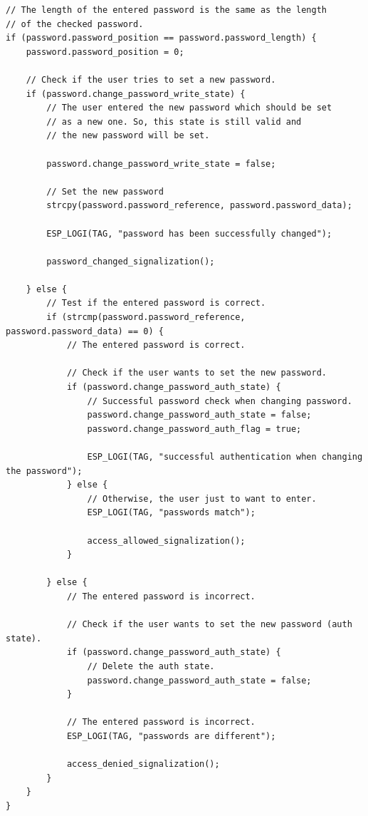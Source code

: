 \documentclass[a4paper, 12pt]{article}
\begin{document}
\begin{lstlisting}[style=CLanguage]
// The length of the entered password is the same as the length
// of the checked password.
if (password.password_position == password.password_length) {
    password.password_position = 0;

    // Check if the user tries to set a new password. 
    if (password.change_password_write_state) {
        // The user entered the new password which should be set
        // as a new one. So, this state is still valid and
        // the new password will be set.
        
        password.change_password_write_state = false;

        // Set the new password
        strcpy(password.password_reference, password.password_data);

        ESP_LOGI(TAG, "password has been successfully changed");

        password_changed_signalization();

    } else {
        // Test if the entered password is correct.
        if (strcmp(password.password_reference, password.password_data) == 0) {
            // The entered password is correct.

            // Check if the user wants to set the new password.
            if (password.change_password_auth_state) {                            
                // Successful password check when changing password.
                password.change_password_auth_state = false;
                password.change_password_auth_flag = true;

                ESP_LOGI(TAG, "successful authentication when changing the password");
            } else {
                // Otherwise, the user just to want to enter.
                ESP_LOGI(TAG, "passwords match");

                access_allowed_signalization();                                
            }
            
        } else {
            // The entered password is incorrect.

            // Check if the user wants to set the new password (auth state).
            if (password.change_password_auth_state) {
                // Delete the auth state.
                password.change_password_auth_state = false;
            }
            
            // The entered password is incorrect.
            ESP_LOGI(TAG, "passwords are different");

            access_denied_signalization();                                                    
        }
    }                                  
}
\end{lstlisting}
\end{document}

